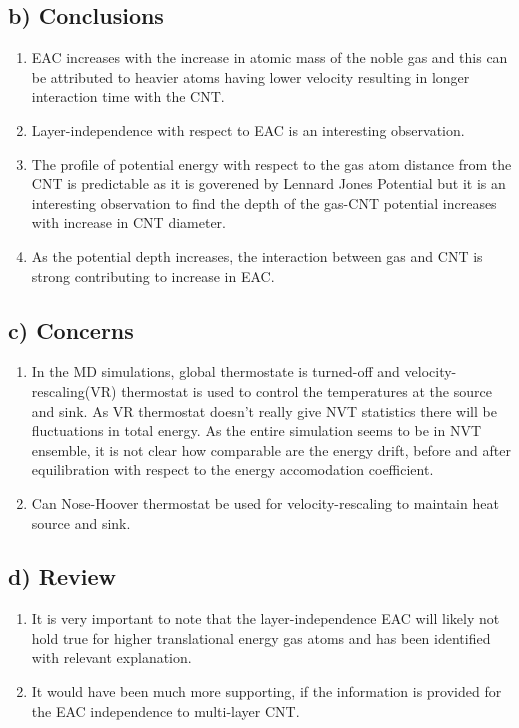\documentclass{article}
\begin{document}
\subsection{b) Conclusions}
\label{sec-3-2}
\begin{enumerate}
\item EAC increases with the increase in atomic mass of the noble gas and this can be attributed to heavier atoms having lower velocity resulting in longer interaction time with the CNT.
\item Layer-independence with respect to EAC is an interesting observation.
\item The profile of potential energy with respect to the gas atom distance from the CNT is predictable as it is goverened by Lennard Jones Potential but it is an interesting observation to find the depth of the gas-CNT potential increases with increase in CNT diameter.
\item As the potential depth increases, the interaction between gas and CNT is strong contributing to increase in EAC.
\end{enumerate}
\subsection{c) Concerns}
\label{sec-3-3}
\begin{enumerate}
\item In the MD simulations, global thermostate is turned-off and velocity-rescaling(VR) thermostat is used to control the temperatures at the source and sink. As VR thermostat doesn't really give NVT statistics there will be fluctuations in total energy. As the entire simulation seems to be in NVT ensemble, it is not clear how comparable are the energy drift, before and after equilibration with respect to the energy accomodation coefficient.
\item Can Nose-Hoover thermostat be used for velocity-rescaling to maintain heat source and sink.
\end{enumerate}
\subsection{d) Review}
\label{sec-3-4}
\begin{enumerate}
\item It is very important to note that the layer-independence EAC will likely not hold true for higher translational energy gas atoms and has been identified with relevant explanation.
\item It would have been much more supporting, if the information is provided for the EAC independence to multi-layer CNT.
\end{enumerate}
\end{document}
